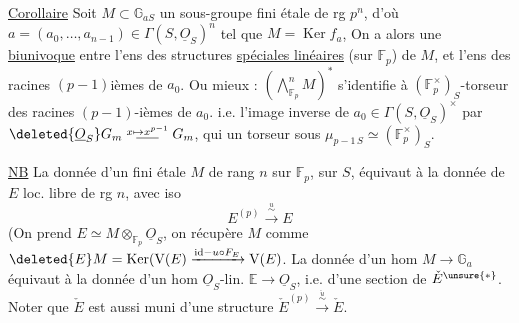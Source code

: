 \uline{Corollaire} Soit $M\subset\mathbb G_{aS}$ un sous-groupe fini étale
 de rg $p^n$, d'où
$a=(a_0,\ldots,a_{n-1})\in\Gamma(S,\underline O_S)^n$ tel que
$M=\operatorname{Ker} f_a$, 
On a alors une \uline{ biunivoque} entre l'ens des structures
\uline{spéciales linéaires} (sur $\mathbb F_p$) de $M$, et l'ens des racines
$(p-1)$ièmes de $a_0$.
Ou mieux : $(\bigwedge_{\mathbb F_p}^{n} M)^*$ s'identifie à
$(\mathbb F_p^{\times})_S$-torseur des racines $(p-1)$-ièmes de $a_0$.
i.e.   l'image inverse de
$a_0\in\Gamma(S,\underline O_S)^\times$ par
$\deleted{\underline O_S}G_m\mathrel{\overset{x\mapsto x^{p-1}}{\rule{1.6em}{.4pt}}}G_m$,
qui  un torseur sous $\mu_{p-1\, S}\simeq(\mathbb F_p^\times)_S$.


\uline{NB}  La donnée d'un  fini étale
 $M$ de rang $n$ sur $\mathbb F_p$, sur $S$, équivaut à la donnée de $E$ loc. libre de rg $n$, avec iso
\[
 E^{(p)}\xrightarrow{\overset{u}{\sim}}E
\]
(On prend $E\simeq M\otimes_{\mathbb F_p}\underline O_S$, on récupère $M$ comme
$\deleted{E}M=\operatorname{Ker}(\mathrm V(E)\xrightarrow{\mathrm{id}-u\circ F_E}\mathrm V(E)$.
La donnée d'un hom $M\longrightarrow\mathbb G_a$ équivaut à la donnée d'un hom
$\underline O_S$-lin. $\mathbb E\longrightarrow\underline O_S$, i.e. d'une section
 \deleted{\unsure{$\xi$}} de $\check E^{\unsure{*}}$.
Noter que $\check E$ est aussi muni d'une structure
$\check E^{(p)}\xrightarrow{\overset{\check u}{\sim}}\check E$.
